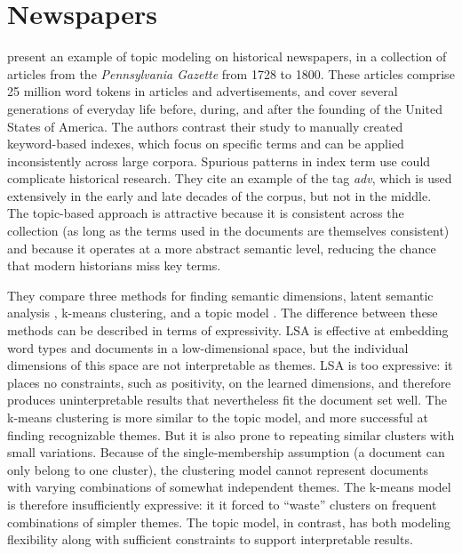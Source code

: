 
\section{Newspapers}

\cite{newman-06} present an example of topic modeling on historical newspapers, in a collection of articles from the {\em Pennsylvania Gazette} from 1728 to 1800.\cite{http://www.accessible-archives.com/}
These articles comprise 25 million word tokens in articles and advertisements, and cover several generations of everyday life before, during, and after the founding of the United States of America.
The authors contrast their study to manually created keyword-based indexes, which focus on specific terms and can be applied inconsistently across large corpora.
Spurious patterns in index term use could complicate historical research. 
They cite an example of the tag {\em adv}, which is used extensively in the early and late decades of the corpus, but not in the middle.
The topic-based approach is attractive because it is consistent across the collection (as long as the terms used in the documents are themselves consistent) and because it operates at a more abstract semantic level, reducing the chance that modern historians miss key terms. 

They compare three methods for finding semantic dimensions, latent semantic analysis \citep{deerwester-90}, k-means clustering, and a topic model \citep{hofmann-99}.
The difference between these methods can be described in terms of expressivity.
LSA is effective at embedding word types and documents in a low-dimensional space, but the individual dimensions of this space are not interpretable as themes.
LSA is too expressive: it places no constraints, such as positivity, on the learned dimensions, and therefore produces uninterpretable results that nevertheless fit the document set well.
The k-means clustering is more similar to the topic model, and more successful at finding recognizable themes.
But it is also prone to repeating similar clusters with small variations.
Because of the single-membership assumption (a document can only belong to one cluster), the clustering model cannot represent documents with varying combinations of somewhat independent themes.
The k-means model is therefore insufficiently expressive: it it forced to ``waste'' clusters on frequent combinations of simpler themes.
The topic model, in contrast, has both modeling flexibility along with sufficient  constraints to support interpretable results.

